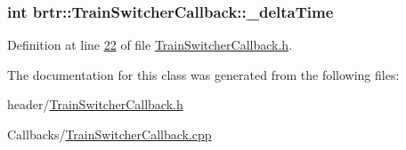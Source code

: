 \hypertarget{classbrtr_1_1_train_switcher_callback_a1d2fbe75d19ca03cba449cdf4277f0eb}{
\subsubsection[{\+\_\+delta\+Time}]{\setlength{\rightskip}{0pt plus 5cm}int brtr\+::\+Train\+Switcher\+Callback\+::\+\_\+delta\+Time\hspace{0.3cm}{\ttfamily [private]}}}\label{classbrtr_1_1_train_switcher_callback_a1d2fbe75d19ca03cba449cdf4277f0eb}


Definition at line \hyperlink{_train_switcher_callback_8h_source_l00022}{22} of file \hyperlink{_train_switcher_callback_8h_source}{Train\+Switcher\+Callback.\+h}.



The documentation for this class was generated from the following files\+:\begin{DoxyCompactItemize}
\item 
header/\hyperlink{_train_switcher_callback_8h}{Train\+Switcher\+Callback.\+h}\item 
Callbacks/\hyperlink{_train_switcher_callback_8cpp}{Train\+Switcher\+Callback.\+cpp}\end{DoxyCompactItemize}
